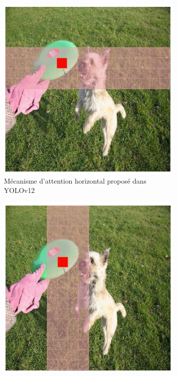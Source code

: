 \begin{figure}[H]
    \vspace{0.35cm}
    \begin{subfigure}[b]{0.30\textwidth}
        \centering
        \includegraphics[width=\textwidth]{02-main/figures/ch2/ch2_yolo_04_attention_area_yolo1.png}
        \caption{Mécanisme d'attention horizontal proposé dans YOLOv12}
        \label{fig:ch2_yolo_04_attention_area_yolo1}
    \end{subfigure}
    \hspace{0.04\textwidth}
    \begin{subfigure}[b]{0.30\textwidth}
        \centering
        \includegraphics[width=\textwidth]{02-main/figures/ch2/ch2_yolo_05_attention_area_yolo2.png}

\end{subfigure}
\end{figure}
